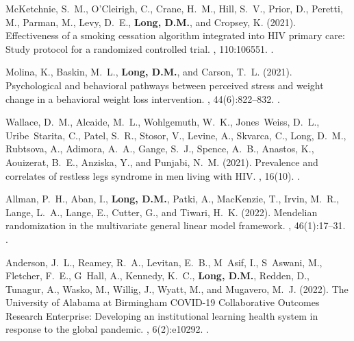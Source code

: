 \begin{thebibliography}{}
McKetchnie, S.~M., O'Cleirigh, C., Crane, H.~M., Hill, S.~V., Prior, D.,
  Peretti, M., Parman, M., Levy, D.~E., \textbf{Long, D.M.}, and Cropsey, K. (2021).
\newblock Effectiveness of a smoking cessation algorithm integrated into {HIV}
  primary care: {Study} protocol for a randomized controlled trial.
, 110:106551.
.  


Molina, K., Baskin, M.~L., \textbf{Long, D.M.}, and Carson, T.~L. (2021).
\newblock Psychological and behavioral pathways between perceived stress and
  weight change in a behavioral weight loss intervention.
, 44(6):822--832.
.  


Wallace, D.~M., Alcaide, M.~L., Wohlgemuth, W.~K., Jones~Weiss, D.~L.,
  Uribe~Starita, C., Patel, S.~R., Stosor, V., Levine, A., Skvarca, C., Long,
  D.~M., Rubtsova, A., Adimora, A.~A., Gange, S.~J., Spence, A.~B., Anastos,
  K., Aouizerat, B.~E., Anziska, Y., and Punjabi, N.~M. (2021).
\newblock Prevalence and correlates of restless legs syndrome in men living
  with {HIV}.
, 16(10).
.  


Allman, P.~H., Aban, I., \textbf{Long, D.M.}, Patki, A., MacKenzie, T., Irvin, M.~R.,
  Lange, L.~A., Lange, E., Cutter, G., and Tiwari, H.~K. (2022).
\newblock Mendelian randomization in the multivariate general linear model
  framework.
, 46(1):17--31.
.   


Anderson, J.~L., Reamey, R.~A., Levitan, E.~B., M~Asif, I., S~Aswani, M.,
  Fletcher, F.~E., G~Hall, A., Kennedy, K.~C., \textbf{Long, D.M.}, Redden, D., Tunagur,
  A., Wasko, M., Willig, J., Wyatt, M., and Mugavero, M.~J. (2022).
\newblock The {University} of {Alabama} at {Birmingham} {COVID}-19
  {Collaborative} {Outcomes} {Research} {Enterprise}: {Developing} an
  institutional learning health system in response to the global pandemic.
, 6(2):e10292.
.  



\end{thebibliography}
